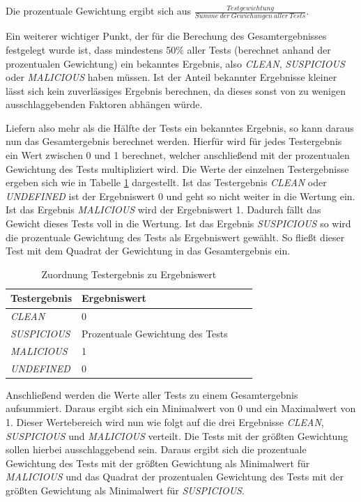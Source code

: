Die prozentuale Gewichtung ergibt sich aus $\frac{Testgewichtung}{Summe~der~Gewichungen~aller~Tests}$.

Ein weiterer wichtiger Punkt, der für die Berechung des Gesamtergebnisses festgelegt wurde ist, dass mindestens 50\% aller Tests (berechnet anhand der prozentualen Gewichtung) ein bekanntes Ergebnis, also \textit{CLEAN}, \textit{SUSPICIOUS} oder \textit{MALICIOUS} haben müssen. Ist der Anteil bekannter Ergebnisse kleiner lässt sich kein zuverlässiges Ergebnis berechnen, da dieses sonst von zu wenigen ausschlaggebenden Faktoren abhängen würde.

Liefern also mehr als die Hälfte der Tests ein bekanntes Ergebnis, so kann daraus nun das Gesamtergebnis berechnet werden. Hierfür wird für jedes Testergebnis ein Wert zwischen 0 und 1 berechnet, welcher anschließend mit der prozentualen Gewichtung des Tests multipliziert wird. Die Werte der einzelnen Testergebnisse ergeben sich wie in Tabelle \ref{tbl:test-values} dargestellt. Ist das Testergebnis \textit{CLEAN} oder \textit{UNDEFINED} ist der Ergebniswert 0 und geht so nicht weiter in die Wertung ein. Ist das Ergebnis \textit{MALICIOUS} wird der Ergebniswert 1. Dadurch fällt das Gewicht dieses Tests voll in die Wertung. Ist das Ergebnis \textit{SUSPICIOUS} so wird die prozentuale Gewichtung des Tests als Ergebniswert gewählt. So fließt dieser Test mit dem Quadrat der Gewichtung in das Gesamtergebnis ein.

\begin{table}[H]
\centering
\begin{tabular}{|l|l|l|l|}
\hline
\textbf{Testergebnis} & \textbf{Ergebniswert}\\\hline
\textit{CLEAN} & 0\\\hline
\textit{SUSPICIOUS} & Prozentuale Gewichtung des Tests\\\hline
\textit{MALICIOUS} & 1\\\hline
\textit{UNDEFINED} & 0\\\hline
\end{tabular}
\caption{Zuordnung Testergebnis zu Ergebniswert}
\label{tbl:test-values}
\end{table}

Anschließend werden die Werte aller Tests zu einem Gesamtergebnis aufsummiert. Daraus ergibt sich ein Minimalwert von 0 und ein Maximalwert von 1. Dieser Wertebereich wird nun wie folgt auf die drei Ergebnisse \textit{CLEAN}, \textit{SUSPICIOUS} und \textit{MALICIOUS} verteilt. Die Tests mit der größten Gewichtung sollen hierbei ausschlaggebend sein. Daraus ergibt sich die prozentuale Gewichtung des Tests mit der größten Gewichtung als Minimalwert für \textit{MALICIOUS} und das Quadrat der prozentualen Gewichtung des Tests mit der größten Gewichtung als Minimalwert für \textit{SUSPICIOUS}.

